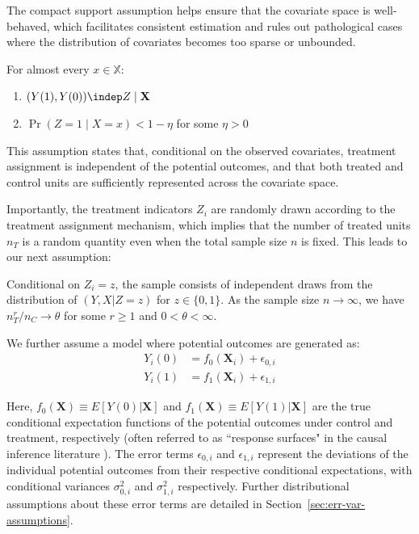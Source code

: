 \documentclass{mytemplate}
\begin{document}
The compact support assumption helps ensure that the covariate space is well-behaved, which facilitates consistent estimation and rules out pathological cases where the distribution of covariates becomes too sparse or unbounded.

\begin{assumption} \label{assum:unconfoundedness} 
For almost every $x \in \mathbb{X}$: \begin{enumerate} \item $(Y(1), Y(0)) \indep Z \mid \mathbf{X}$ \item $\Pr(Z=1 \mid X = x) < 1 - \eta$ for some $\eta > 0$ \end{enumerate} 
\end{assumption}

This assumption states that, conditional on the observed covariates, treatment assignment is independent of the potential outcomes, and that both treated and control units are sufficiently represented across the covariate space.

Importantly, the treatment indicators $Z_i$ are randomly drawn according to the treatment assignment mechanism, which implies that the number of treated units $n_T$ is a random quantity even when the total sample size $n$ is fixed. This leads to our next assumption:

\begin{assumption}[Sampling]
\label{assum:sampling}
Conditional on $Z_i=z$, the sample consists of independent draws from the distribution of $(Y, X | Z=z)$ for $z \in \{0,1\}$. As the sample size $n \to \infty$, we have $n_T^r/n_C \to \theta$ for some $r \geq 1$ and $0 < \theta < \infty$.
\end{assumption}



We further assume a model where potential outcomes are generated as:
\begin{align*}
	Y_i(0) &= f_0(\mathbf{X}_i) + \epsilon_{0,i} \\ 
	Y_i(1) &= f_1(\mathbf{X}_i) + \epsilon_{1,i}
\end{align*}

Here, $f_0(\mathbf{X}) \equiv E[Y(0) | \mathbf{X}]$ and $f_1(\mathbf{X}) \equiv E[Y(1) | \mathbf{X}]$ are the true conditional expectation functions of the potential outcomes under control and treatment, respectively (often referred to as ``response surfaces" in the causal inference literature \citep{hahn2020bayesian, hill2011bayesian}). The error terms $\epsilon_{0,i}$ and $\epsilon_{1,i}$ represent the deviations of the individual potential outcomes from their respective conditional expectations, with conditional variances $\sigma_{0,i}^2$ and $\sigma_{1,i}^2$ respectively. Further distributional assumptions about these error terms are detailed in Section~\ref{sec:err-var-assumptions}.
\end{document}
